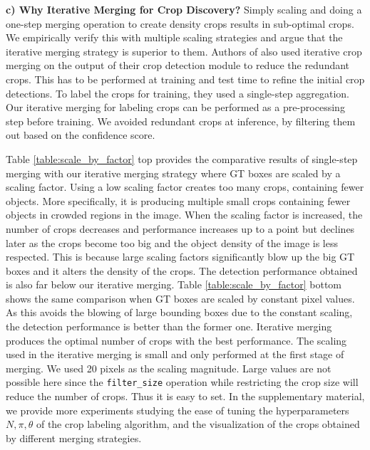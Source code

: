 \noindent \textbf{c) Why Iterative Merging for Crop Discovery?}  
Simply scaling and doing a one-step merging operation to create density crops results in sub-optimal crops. We empirically verify this with multiple scaling strategies and argue that the iterative merging strategy is superior to them. Authors of \cite{clusnet-Yang-2019} also used iterative crop merging on the output of their crop detection module to reduce the redundant crops. This has to be performed at training and test time to refine the initial crop detections. To label the crops for training, they used a single-step aggregation. Our iterative merging for labeling crops can be performed as a pre-processing step before training. We avoided redundant crops at inference, by filtering them out based on the confidence score.

Table \ref{table:scale_by_factor} top provides the comparative results of single-step merging with our iterative merging strategy where GT boxes are scaled by a scaling factor. Using a low scaling factor creates too many crops, containing fewer objects. More specifically, it is producing multiple small crops containing fewer objects in crowded regions in the image. When the scaling factor is increased, the number of crops decreases and performance increases up to a point but declines later as the crops become too big and the object density of the image is less respected. This is because large scaling factors significantly blow up the big GT boxes and it alters the density of the crops. The detection performance obtained is also far below our iterative merging. Table \ref{table:scale_by_factor} bottom shows the same comparison when GT boxes are scaled by constant pixel values. As this avoids the blowing of large bounding boxes due to the constant scaling, the detection performance is better than the former one. Iterative merging produces the optimal number of crops with the best performance. The scaling used in the iterative merging is small and only performed at the first stage of merging. We used 20 pixels as the scaling magnitude. Large values are not possible here since the \texttt{filter\_size} operation while restricting the crop size will reduce the number of crops. Thus it is easy to set. In the supplementary material, we provide more experiments studying the ease of tuning the hyperparameters $N, \pi, \theta$ of the crop labeling algorithm, and the visualization of the crops obtained by different merging strategies.


